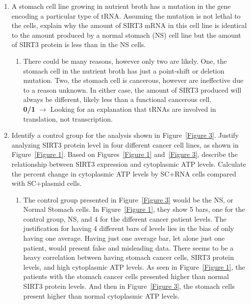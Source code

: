\documentclass[11pt]{article}
\begin{document}
    \begin{enumerate}
        \item A stomach cell line growing in nutrient broth has a mutation in the gene encoding a particular
type of tRNA\@. Assuming the mutation is not lethal to the cells, explain why the amount
of SIRT3 mRNA in this cell line is identical to the amount produced by a normal stomach (NS)
cell line but the amount of SIRT3 protein is less than in the NS cells.
        \begin{enumerate}
            \item There could be many reasons, however only two are likely.
            One, the stomach cell in the nutrient broth has just a point-shift or deletion mutation.
            Two, the stomach cell is cancerous, however are ineffective due to a reason unknown.
            In either case, the amount of SIRT3 produced will always be different, likely less than a functional cancerous cell.\\
            \textbf{0/1} $\rightarrow$ Looking for an explanation that tRNAs are involved in translation, not transcription.
        \end{enumerate}
        \item Identify a control group for the analysis shown in Figure~\ref{Figure 3}.
        Justify analyzing SIRT3 protein level in
        four different cancer cell lines, as shown in Figure~\ref{Figure 1}.
        Based on Figures~\ref{Figure 1} and~\ref{Figure 3}, describe the
        relationship between SIRT3 expression and cytoplasmic ATP levels.
        Calculate the percent change
        in cytoplasmic ATP levels by SC+RNA cells compared with SC+plasmid cells.
        \begin{enumerate}
            \item The control group presented in Figure~\ref{Figure 3} would be the NS, or Normal Stomach cells.
            In Figure~\ref{Figure 1}, they show 5 bars, one for the control group, NS, and 4 for the different cancer patient levels.
            The justification for having 4 different bars of levels lies in the bias of only having one average.
            Having just one average bar, let alone just one patient, would present false and misleading data.
            There seems to be a heavy correlation between having stomach cancer cells, SIRT3 protein levels, and high cytoplasmic ATP levels.
            As seen in Figure~\ref{Figure 1}, the patients with the stomach cancer cells presented higher than normal SIRT3 protein levels.
            And then in Figure~\ref{Figure 3}, the stomach cells present higher than normal cytoplasmic ATP levels.

\end{enumerate}
\end{enumerate}
\end{document}
